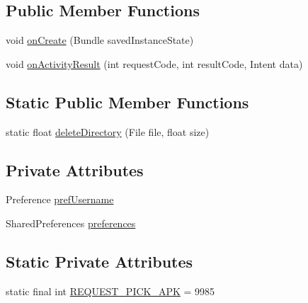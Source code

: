 \subsection*{Public Member Functions}
\begin{DoxyCompactItemize}
\item 
void \hyperlink{classorg_1_1buildmlearn_1_1toolkit_1_1fragment_1_1SettingsFragment_a10a23ddbe28f027456dfc3b8c31140f3}{on\+Create} (Bundle saved\+Instance\+State)
\item 
void \hyperlink{classorg_1_1buildmlearn_1_1toolkit_1_1fragment_1_1SettingsFragment_a202327f9066d9fcf98b2ca239cf9f1c4}{on\+Activity\+Result} (int request\+Code, int result\+Code, Intent data)
\end{DoxyCompactItemize}
\subsection*{Static Public Member Functions}
\begin{DoxyCompactItemize}
\item 
static float \hyperlink{classorg_1_1buildmlearn_1_1toolkit_1_1fragment_1_1SettingsFragment_ad1d3b5a0eccea60aef8f5b82613d4c9d}{delete\+Directory} (File file, float size)
\end{DoxyCompactItemize}
\subsection*{Private Attributes}
\begin{DoxyCompactItemize}
\item 
Preference \hyperlink{classorg_1_1buildmlearn_1_1toolkit_1_1fragment_1_1SettingsFragment_a82ea20aa28be2d2f7aee02d939144c1e}{pref\+Username}
\item 
Shared\+Preferences \hyperlink{classorg_1_1buildmlearn_1_1toolkit_1_1fragment_1_1SettingsFragment_a25030d7c4bcf37c31464f8861bdd888c}{preferences}
\end{DoxyCompactItemize}
\subsection*{Static Private Attributes}
\begin{DoxyCompactItemize}
\item 
static final int \hyperlink{classorg_1_1buildmlearn_1_1toolkit_1_1fragment_1_1SettingsFragment_a7560e9f4d7da50c82e5a66854ccab436}{R\+E\+Q\+U\+E\+S\+T\+\_\+\+P\+I\+C\+K\+\_\+\+A\+PK} = 9985
\end{DoxyCompactItemize}


